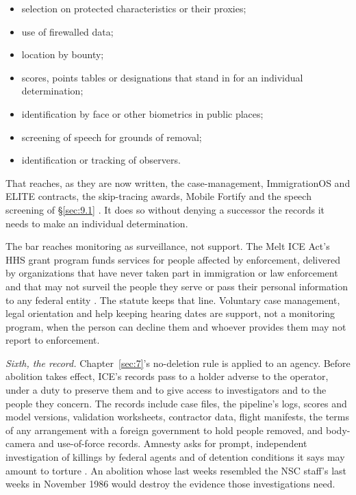 \begin{itemize}
\item selection on protected characteristics or their proxies;
\item use of firewalled data;
\item location by bounty;
\item scores, points tables or designations that stand in for an individual determination;
\item identification by face or other biometrics in public places;
\item screening of speech for grounds of removal;
\item identification or tracking of observers.
\end{itemize}

That reaches, as they are now written, the case-management, ImmigrationOS and ELITE contracts, the skip-tracing awards, Mobile Fortify and the speech screening of \S\ref{sec:9.1} \autocite{Koebler2025ICM,Ho2025ImmigrationOS,Cox2026ELITE,Biddle2025BountyHunters,Cox2025MobileFortify,Caputo2025CatchRevoke}. It does so without denying a successor the records it needs to make an individual determination.

The bar reaches monitoring as surveillance, not support. The Melt ICE Act's HHS grant program funds services for people affected by enforcement, delivered by organizations that have never taken part in immigration or law enforcement and that may not surveil the people they serve or pass their personal information to any federal entity \autocite{hr7190}. The statute keeps that line. Voluntary case management, legal orientation and help keeping hearing dates are support, not a monitoring program, when the person can decline them and whoever provides them may not report to enforcement.

\emph{Sixth, the record.} Chapter~\ref{sec:7}'s no-deletion rule is applied to an agency. Before abolition takes effect, ICE's records pass to a holder adverse to the operator, under a duty to preserve them and to give access to investigators and to the people they concern. The records include case files, the pipeline's logs, scores and model versions, validation worksheets, contractor data, flight manifests, the terms of any arrangement with a foreign government to hold people removed, and body-camera and use-of-force records. Amnesty asks for prompt, independent investigation of killings by federal agents and of detention conditions it says may amount to torture \autocite{Amnesty2026Whistles}. An abolition whose last weeks resembled the NSC staff's last weeks in November 1986 would destroy the evidence those investigations need.

